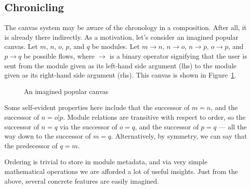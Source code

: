 \subsection{Chronicling}
\label{chronology}
The canvas system may be aware of the chronology in a composition. After all, 
it is already there indirectly. As a motivation, let's consider an imagined 
popular canvas. Let $m$, $n$, $o$, $p$, and $q$ be modules. Let $m \to n$, $n 
\to o$, $n \to p$, $o \to p$, and $p \to q$ be possible flows, where $\to$ is 
a binary operator signifying that the user is sent from the module given as 
its left-hand side argument (lhs) to the module given as its right-hand side 
argument (rhs). This canvas is shown in Figure~\ref{canvas}.

\begin{figure}[H]
\begin{centering}
\caption{An imagined popular canvas}
\label{canvas}
\end{centering}
\end{figure}

Some self-evident properties here include that the successor of $m = n$, and 
the successor of $n = o \vert p$. Module relations are transitive with respect 
to order, so the successor of $n = q$ via the successor of $o = q$, and the 
successor of $p = q$ --- all the way down to the successor of $m = q$. 
Alternatively, by symmetry, we can say that the predecessor of $q = m$.

Ordering is trivial to store in module metadata, and via very simple 
mathematical operations we are afforded a lot of useful insights. Just from 
the above, several concrete features are easily imagined.

